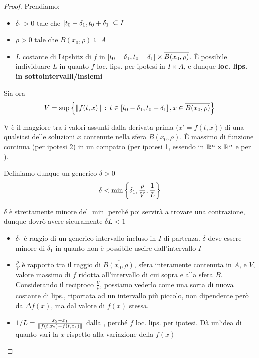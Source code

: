 \begin{theorem}
\begin{proof}
		Prendiamo:
		\begin{itemize}
			\item $\delta_1>0$ tale che $\left[t_0-\delta_1,t_0+\delta_1\right]\subseteq I$
			\item $\rho>0$ tale che $\overline{B(x_0,\rho)}\subseteq A$
			\item $L$ costante di Lipshitz di $f$ in $\left[t_0-\delta_1,t_0+\delta_1\right]\times\overline{B(x_0,\rho)}$. È possibile individuare $L$ in quanto $f$ loc. lips. per ipotesi in $I\times A$, e dunque \textbf{loc. lips. in sottointervalli/insiemi}
		\end{itemize}
		Sia ora
		$$V = \sup\left\{\left\|f(t,x)\right\|\,:\,t\in\left[t_0-\delta_1,t_0+\delta_1\right],x\in\overline{B(x_0,\rho)}\right\}$$
		\begin{note}
			V è il maggiore tra i valori assunti dalla derivata prima $\bigl(x'=f(t,x)\bigr)$ di una qualsiasi delle soluzioni $x$ contenute nella sfera $\overline{B(x_0,\rho)}$. È massimo di funzione continua (per ipotesi 2) in un compatto (per ipotesi 1, essendo in $\mathbb{R}^n\times\mathbb{R}^n$ e per ).\\%
		\end{note}
		Definiamo dunque un generico $\delta>0$
		\begin{equation}
			\label{eq:cau_delta}
			\delta<\min\left\{\delta_1,\frac{\rho}{V},\frac{1}{L}\right\}
		\end{equation}
		\begin{note}
			$\delta$ è strettamente minore del $\min$ perché poi servirà a trovare una contrazione, dunque dovrò avere sicuramente $\delta L < 1$
		\end{note}
		\begin{itemize}
			\item $\delta_1$ è raggio di un generico intervallo incluso in $I$ di partenza. $\delta$ deve essere minore di $\delta_1$ in quanto non è possibile uscire dall'intervallo $I$
			\item $\frac{\rho}{V}$ è rapporto tra il raggio di $\overline{B(x_0,\rho)}$, sfera interamente contenuta in $A$, e $V$, valore massimo di $f$ ridotta all'intervallo di cui sopra e alla sfera $\overline{B}$.\\
			Considerando il reciproco $\frac{V}{\rho}$, possiamo vederlo come una sorta di nuova costante di lips., riportata ad un intervallo più piccolo, non dipendente però da $\Delta f(x)$, ma dal valore di $f(x)$ stessa.
			\item $1/L = \frac{\left\|x_2-x_1\right\|}{\left\|f(t,x_2)-f(t,x_1)\right\|}$ dalla , perché $f$ loc. lips. per ipotesi. Dà un'idea di quanto vari la $x$ rispetto alla variazione della $f(x)$

\end{itemize}
\end{proof}
\end{theorem}
